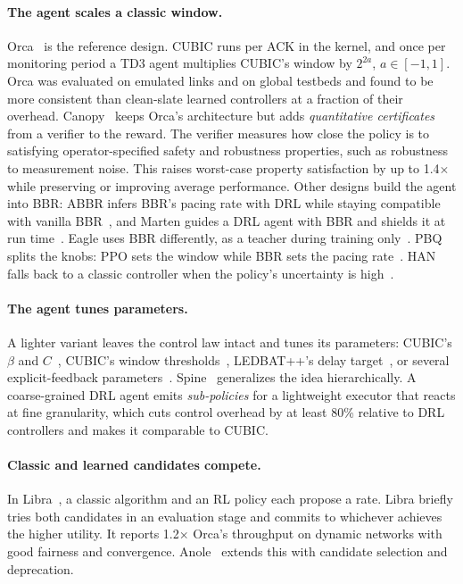 \paragraph{The agent scales a classic window.} Orca~\cite{abbasloo2020orca} is the reference design. CUBIC runs per ACK in the kernel, and once per monitoring period a TD3 agent multiplies CUBIC's window by $2^{2a}$, $a\in[-1,1]$. Orca was evaluated on emulated links and on global testbeds and found to be more consistent than clean-slate learned controllers at a fraction of their overhead. Canopy~\cite{yang2024canopy} keeps Orca's architecture but adds \emph{quantitative certificates} from a verifier to the reward. The verifier measures how close the policy is to satisfying operator-specified safety and robustness properties, such as robustness to measurement noise. This raises worst-case property satisfaction by up to 1.4$\times$ while preserving or improving average performance. Other designs build the agent into BBR: ABBR infers BBR's pacing rate with DRL while staying compatible with vanilla BBR~\cite{pan2023making}, and Marten guides a DRL agent with BBR and shields it at run time~\cite{zhou2025safety}. Eagle uses BBR differently, as a teacher during training only~\cite{emara2020eagle}. PBQ splits the knobs: PPO sets the window while BBR sets the pacing rate~\cite{zhang2023pbq}. HAN falls back to a classic controller when the policy's uncertainty is high~\cite{jia2026han}.

\paragraph{The agent tunes parameters.} A lighter variant leaves the control law intact and tunes its parameters: CUBIC's $\beta$ and $C$~\cite{sharma2026adaptive}, CUBIC's window thresholds~\cite{abedini2025cubic}, LEDBAT++'s delay target~\cite{tang2023combining}, or several explicit-feedback parameters~\cite{kheirkhah2023acct}. Spine~\cite{tian2024spine} generalizes the idea hierarchically. A coarse-grained DRL agent emits \emph{sub-policies} for a lightweight executor that reacts at fine granularity, which cuts control overhead by at least 80\% relative to DRL controllers and makes it comparable to CUBIC.

\paragraph{Classic and learned candidates compete.} In Libra~\cite{du2025libra,du2021libra}, a classic algorithm and an RL policy each propose a rate. Libra briefly tries both candidates in an evaluation stage and commits to whichever achieves the higher utility. It reports 1.2$\times$ Orca's throughput on dynamic networks with good fairness and convergence. Anole~\cite{han2025anole} extends this with candidate selection and deprecation.

